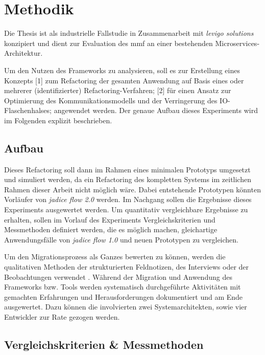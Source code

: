 \chapter{Methodik}
\label{chap:methodik}

Die Thesis ist als industrielle Fallstudie in Zusammenarbeit mit \emph{levigo solutions} konzipiert und dient zur Evaluation des \gls{mmf} an einer bestehenden Microservices-Architektur.

Um den Nutzen des Frameworks zu analysieren, soll es zur Erstellung eines Konzepts [1] zum Refactoring der gesamten Anwendung auf Basis eines oder mehrerer (identifizierter) Refactoring-Verfahren; [2] für einen Ansatz zur Optimierung des Kommunikationsmodells und der Verringerung des IO-Flaschenhalses; angewendet werden.
Der genaue Aufbau dieses Experiments wird im Folgenden explizit beschrieben.

\section{Aufbau}

Dieses Refactoring soll dann im Rahmen eines minimalen Prototyps umgesetzt und simuliert werden, da ein Refactoring des kompletten Systems im zeitlichen Rahmen dieser Arbeit nicht möglich wäre.
Dabei entstehende Prototypen könnten Vorläufer von \emph{jadice flow 2.0} werden.
Im Nachgang sollen die Ergebnisse dieses Experiments ausgewertet werden. Um quantitativ vergleichbare Ergebnisse zu erhalten, sollen im Vorlauf des Experiments Vergleichskriterien und Messmethoden definiert werden, die es möglich machen, gleichartige Anwendungsfälle von \emph{jadice flow 1.0} und neuen Prototypen zu vergleichen.

Um den Migrationsprozess als Ganzes bewerten zu können, werden die qualitativen Methoden der strukturierten Feldnotizen, des Interviews oder der Beobachtungen verwendet \cite{seaman2008qualitative}. 
Während der Migration und Anwendung des Frameworks bzw. Tools werden systematisch durchgeführte Aktivitäten mit gemachten Erfahrungen und Herausforderungen dokumentiert und am Ende ausgewertet. 
Dazu können die involvierten zwei Systemarchitekten, sowie vier Entwickler zur Rate gezogen werden.

\section{Vergleichskriterien \& Messmethoden}
